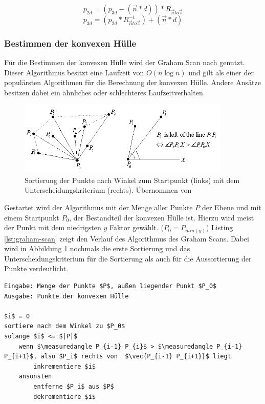 \begin{equation} \label{eq:projection2d}
p_{2d} = (p_{3d} - (\vec{n}*d)) * R_{\vec{n}to\vec{z}}
\end{equation}
\begin{equation} \label{eq:projection3d}
p_{3d} = (p_{2d} * R_{\vec{n}to\vec{z}}^{-1}) + (\vec{n}*d)
\end{equation}

\subsubsection{Bestimmen der konvexen Hülle}

Für die Bestimmen der konvexen Hülle wird der Graham Scan nach \citet{graham1972efficient} genutzt. Dieser Algorithmus besitzt eine Laufzeit von \(O(n \log n)\) und gilt als einer der populärsten Algorithmen für die Berechnung der konvexen Hülle. Andere Ansätze besitzen dabei ein ähnliches oder schlechteres Laufzeitverhalten. \\

\begin{figure}[h]
  \centering
	\includegraphics[width=0.9\textwidth]{content/images/methods/convexhull.png} 
  \caption{Sortierung der Punkte nach Winkel zum Startpunkt (links) mit dem Unterscheidungskriterium (rechts). Übernommen von \citet{convexHull}}
  \label{fig:convexhull}
\end{figure}

Gestartet wird der Algorithmus mit der Menge aller Punkte \(P\) der Ebene und mit einem Startpunkt \(P_0\), der Bestandteil der konvexen Hülle ist. Hierzu wird meist der Punkt mit dem niedrigsten \(y\) Faktor gewählt. (\(P_0=P_{min(y)}\)) Listing \ref{lst:graham-scan} zeigt den Verlauf des Algorithmus des Graham Scans. Dabei wird in Abbildung \ref{fig:convexhull} nochmals die erste Sortierung und das Unterscheidungskriterium für die Sortierung als auch für die Aussortierung der Punkte verdeutlicht. \citep{convexHull} \\


\begin{lstlisting}[mathescape,caption=Graham Scan Algorithmus, label=lst:graham-scan]
Eingabe: Menge der Punkte $P$, außen liegender Punkt $P_0$
Ausgabe: Punkte der konvexen Hülle

$i$ = 0
sortiere nach dem Winkel zu $P_0$
solange $i$ <= $|P|$
    wenn $\measuredangle P_{i-1} P_{i}$ > $\measuredangle P_{i-1} P_{i+1}$, also $P_i$ rechts von  $\vec{P_{i-1} P_{i+1}}$ liegt
        inkrementiere $i$
    ansonsten
        entferne $P_i$ aus $P$
        dekrementiere $i$
    
\end{lstlisting} 



